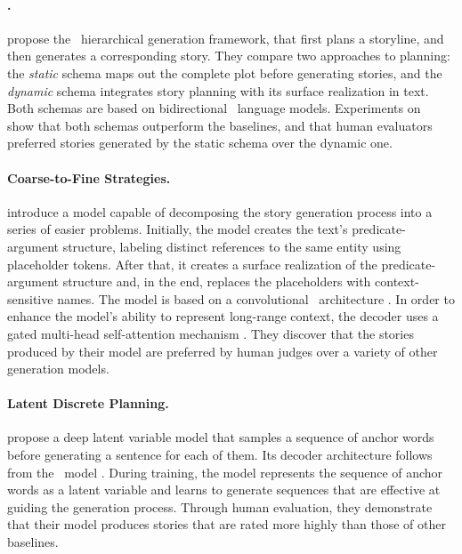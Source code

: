 \paragraph{\paw.}
\citet{yao2019plan} propose the \paw\ hierarchical generation framework, that first plans a storyline, and then generates a corresponding story. They compare two approaches to planning: the \emph{static} schema maps out the complete plot before generating stories, and the \emph{dynamic} schema integrates story planning with its surface realization in text. Both schemas are based on bidirectional \rnn\ language models. Experiments on \roc\ \citep{mostafazadeh2016corpus} show that both schemas outperform the baselines, and that human evaluators preferred stories generated by the static schema over the dynamic one.

\paragraph{Coarse-to-Fine Strategies.}
\citet{fan-etal-2019-strategies} introduce a model capable of decomposing the story generation process into a series of easier problems. Initially, the model creates the text's predicate-argument structure, labeling distinct references to the same entity using placeholder tokens. After that, it creates a surface realization of the predicate-argument structure and, in the end, replaces the placeholders with context-sensitive names. The model is based on a convolutional \seqseq\ architecture \citep{gehring2017convolutional}. In order to enhance the model's ability to represent long-range context, the decoder uses a gated multi-head self-attention mechanism \citep{fan2018hierarchical}. They discover that the stories produced by their model are preferred by human judges over a variety of other generation models.

\paragraph{Latent Discrete Planning.}
\citet{jhamtani-berg-kirkpatrick-2020-narrative} propose a deep latent variable model that samples a sequence of anchor words before generating a sentence for each of them. Its decoder architecture follows from the \paw\ model \citep{yao2019plan}. During training, the model represents the sequence of anchor words as a latent variable and learns to generate sequences that are effective at guiding the generation process. Through human evaluation, they demonstrate that their model produces stories that are rated more highly than those of other baselines.

